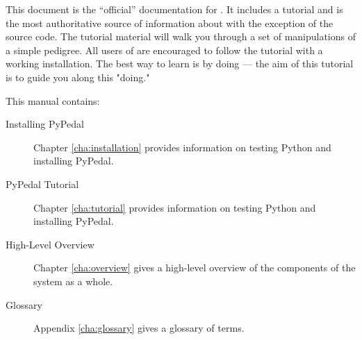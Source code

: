 This document is the ``official'' documentation for \PyPedal{}. It includes a tutorial and is the most authoritative source of information about \PyPedal{} with the exception of the source code. The tutorial material will walk you through a set of manipulations of a simple pedigree.  All users of \PYPEDAL{} are encouraged to follow the tutorial with a working \PYPEDAL{} installation. The best way to learn is by doing --- the aim of this tutorial is to guide you along this "doing."

This manual contains:
\begin{description}
\item[Installing PyPedal] Chapter \ref{cha:installation} provides information
   on testing Python and installing PyPedal.
\item[PyPedal Tutorial] Chapter \ref{cha:tutorial} provides information
   on testing Python and installing PyPedal.
\item[High-Level Overview] Chapter \ref{cha:overview} gives a
   high-level overview of the components of the \PyPedal{} system as a whole.
\item[Glossary] Appendix \ref{cha:glossary} gives a glossary of terms.
\end{description}

